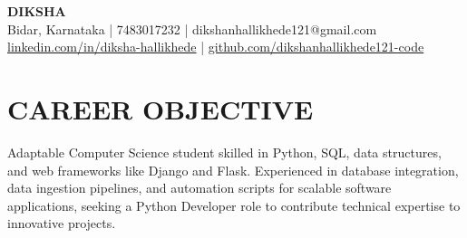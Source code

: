\documentclass{article}
\begin{document}
\begin{center}
    {\Huge \textbf{DIKSHA}} \\[6pt]
    Bidar, Karnataka | 7483017232 | dikshanhallikhede121@gmail.com \\
    \href{https://linkedin.com/in/diksha-hallikhede}{linkedin.com/in/diksha-hallikhede} | \href{https://github.com/dikshanhallikhede121-code}{github.com/dikshanhallikhede121-code}
\end{center}

\section*{CAREER OBJECTIVE}
Adaptable Computer Science student skilled in Python, SQL, data structures, and web frameworks like Django and Flask. Experienced in database integration, data ingestion pipelines, and automation scripts for scalable software applications, seeking a Python Developer role to contribute technical expertise to innovative projects.
\end{document}
